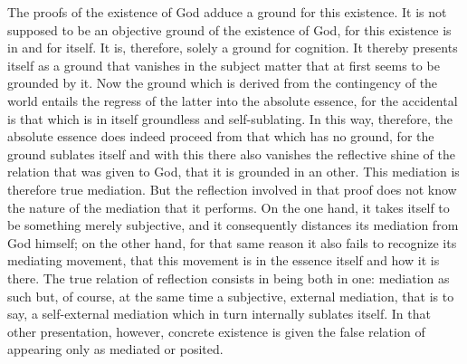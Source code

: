 The proofs of the existence of God
adduce a ground for this existence.
It is not supposed to be an objective
ground of the existence of God,
for this existence is in and for itself.
It is, therefore, solely a ground for cognition.
It thereby presents itself as a ground
that vanishes in the subject matter
that at first seems to be grounded by it.
Now the ground which is derived
from the contingency of the world
entails the regress of the latter
into the absolute essence,
for the accidental is that which is
in itself groundless and self-sublating.
In this way, therefore, the absolute essence
does indeed proceed from that which has no ground,
for the ground sublates itself
and with this there also vanishes
the reflective shine of the relation
that was given to God, that it is grounded in an other.
This mediation is therefore true mediation.
But the reflection involved in that proof does not know
the nature of the mediation that it performs.
On the one hand, it takes itself to be something merely subjective,
and it consequently distances its mediation from God himself;
on the other hand, for that same reason it
also fails to recognize its mediating movement,
that this movement is in the essence itself and how it is there.
The true relation of reflection consists
in being both in one:
mediation as such but, of course, at the same time
a subjective, external mediation,
that is to say, a self-external mediation
which in turn internally sublates itself.
In that other presentation, however,
concrete existence is given the false relation
of appearing only as mediated or posited.

